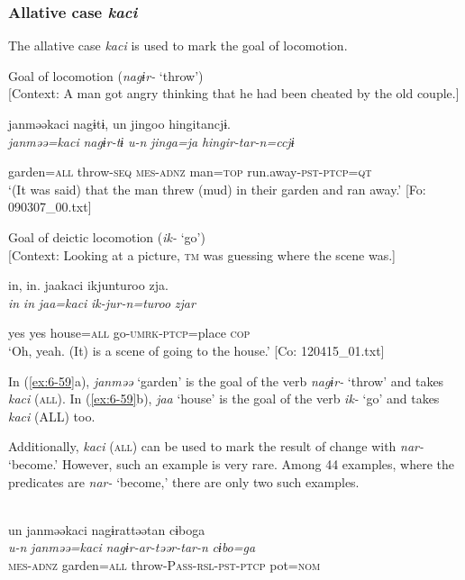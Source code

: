 \begin{table}
\subsubsection{Allative case \textit{kaci}}

The allative case \textit{kaci} is used to mark the goal of locomotion.

\ea\label{ex:6-59}
\ea Goal of locomotion (\textit{nagɨr-} ‘throw’)\\{}
[Context: A man got angry thinking that he had been cheated by the old couple.]

{\TM}
\glll janməəkaci  nagɨtɨ,  un  jingoo  hingitancjɨ.\\

      \textit{janməə=kaci}  \textit{nagɨr-tɨ}  \textit{u-n}  \textit{jinga=ja}  \textit{hingir-tar-n=ccjɨ}

      garden=\textsc{all}  throw-\textsc{seq}  \textsc{mes}-\textsc{adnz}  man=\textsc{top}  run.away-\textsc{pst}-\textsc{ptcp}=\textsc{qt}\\
\glt ‘(It was said) that the man threw (mud) in their garden and ran away.’ [Fo: 090307\_00.txt]
\z

\ex Goal of deictic locomotion (\textit{ik-} ‘go’)\\{}
[Context: Looking at a picture, \textsc{tm} was guessing where the scene was.]

{\TM}
\glll in,  in.  jaakaci  ikjunturoo  zja.\\

      \textit{in}  \textit{in}  \textit{jaa=kaci}  \textit{ik-jur-n=turoo}  \textit{zjar}

      yes  yes  house=\textsc{all}  go-\textsc{umrk}-\textsc{ptcp}=place  \textsc{cop}\\
\glt ‘Oh, yeah. (It) is a scene of going to the house.’ [Co: 120415\_01.txt]
\z

In (\ref{ex:6-59}a), \textit{janməə} ‘garden’ is the goal of the verb \textit{nagɨr-} ‘throw’ and takes \textit{kaci} (\textsc{all}). In (\ref{ex:6-59}b), \textit{jaa} ‘house’ is the goal of the verb \textit{ik-} ‘go’ and takes \textit{kaci} (ALL) too.

Additionally, \textit{kaci} (\textsc{all}) can be used to mark the result of change with \textit{nar-} ‘become.’ However, such an example is very rare. Among 44 examples, where the predicates are \textit{nar-} ‘become,’ there are only two such examples.

\ea\label{ex:6-60}
\ea{}\\
{\TM}
\glll  un  janməəkaci  nagɨrattəətan  cɨboga\\
\textit{u-n}  \textit{janməə=kaci}  \textit{nagɨr-ar-təər-tar-n}  \textit{cɨbo=ga}\\
\textsc{mes}-\textsc{adnz}  garden=\textsc{all}  throw-P\textsc{ass}-\textsc{rsl}-\textsc{pst}-\textsc{ptcp}  pot=\textsc{nom}


\end{table}
